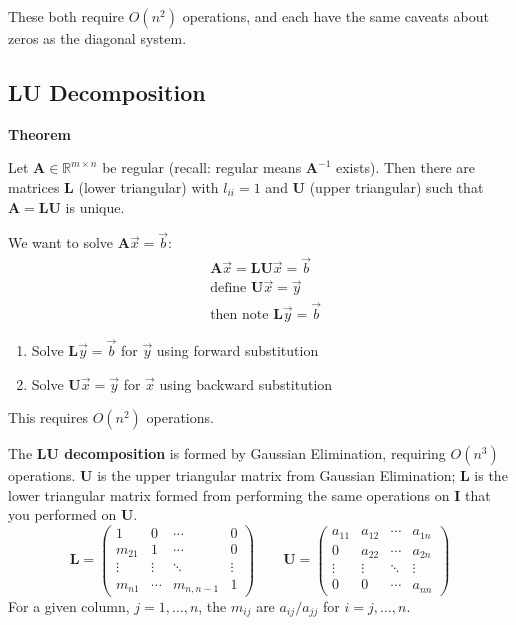 \documentclass[12pt]{article}
\newcommand{\ve}[1]{\ensuremath{\mathbf{#1}}}
\begin{document}
These both require $O(n^2)$ operations, and each have the same caveats about zeros as the diagonal system.

\subsection*{LU Decomposition}

\textbf{Theorem}

Let $\ve{A} \in \mathbb{R}^{m \times n}$ be regular (recall: regular means $\ve{A}^{-1}$ exists). Then there are matrices $\ve{L}$ (lower triangular) with $l_{ii} = 1$ and $\ve{U}$ (upper triangular) such that $\ve{A} = \ve{L}\ve{U}$ is unique.

We want to solve $\ve{A}\vec{x} = \vec{b}$:
%
\begin{align}
&\ve{A}\vec{x} = \ve{L}\ve{U}\vec{x} = \vec{b} \nonumber \\
%
&\text{define } \ve{U}\vec{x} = \vec{y} \nonumber \\
%
&\text{then note }\ve{L}\vec{y} = \vec{b} \nonumber
\end{align}
%
\begin{enumerate}
\item Solve $\ve{L}\vec{y} = \vec{b}$ for $\vec{y}$ using forward substitution
\item Solve $\ve{U}\vec{x} = \vec{y}$ for $\vec{x}$ using backward substitution
\end{enumerate}
%
This requires $O(n^2)$ operations.

The \textbf{LU decomposition} is formed by Gaussian Elimination, requiring $O(n^3)$ operations. $\ve{U}$ is the upper triangular matrix from Gaussian Elimination; $\ve{L}$ is the lower triangular matrix formed from performing the same operations on $\ve{I}$ that you performed on $\ve{U}$. 
%
\begin{equation}
   \ve{L} = \begin{pmatrix}
      1      & 0      & \cdots    & 0 \\
      m_{21} & 1      & \cdots    & 0 \\
      \vdots & \vdots & \ddots    & \vdots \\     
      m_{n1} & \cdots & m_{n,n-1} & 1 
    \end{pmatrix} \qquad
  \ve{U} = \begin{pmatrix}
      a_{11} & a_{12} & \cdots & a_{1n} \\
      0      & a_{22} & \cdots & a_{2n} \\
      \vdots & \vdots & \ddots & \vdots \\     
      0      & 0      & \cdots &  a_{nn} 
    \end{pmatrix}
    \nonumber   
\end{equation} 
%
For a given column, $j = 1, \dots, n$, the $m_{ij}$ are $a_{ij} / a_{jj}$ for $i = j, \dots, n$. 
\end{document}
